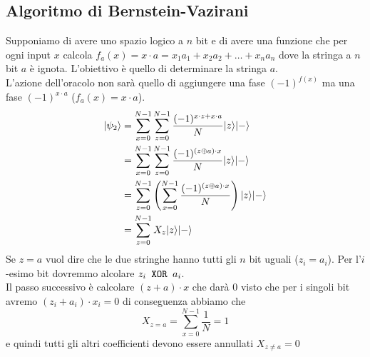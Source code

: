 \documentclass[12pt, a4paper]{report}
\begin{document}
\subsection{Algoritmo di Bernstein-Vazirani}
Supponiamo di avere uno spazio logico a $n$ bit e di avere una funzione che per ogni input $x$ calcola $f_{a}(x)=x\cdot a = x_{1}a_{1}+x_{2}a_{2}+\ldots+x_{n}a_{n}$ dove la stringa a $n$ bit $a$ è ignota. L'obiettivo è quello di determinare la stringa $a$.\\
L'azione dell'oracolo non sarà quello di aggiungere una fase $(-1)^{f(x)}$ ma una fase $(-1)^{x\cdot a}$ ($f_{a}(x)=x\cdot a$).
\begin{equation*}
    \begin{split}
        | \psi_{2} \rangle &= \sum_{x=0}^{N-1}\sum_{z=0}^{N-1} \frac{(-1)^{x\cdot z+x\cdot a}}{N}| z \rangle| - \rangle \\
        &= \sum_{x=0}^{N-1}\sum_{z=0}^{N-1} \frac{(-1)^{(z\oplus a)\cdot x}}{N}| z \rangle| - \rangle \\
        &= \sum_{z=0}^{N-1}\left(\sum_{x=0}^{N-1} \frac{(-1)^{(z\oplus a)\cdot x}}{N}\right)| z \rangle| - \rangle \\
        &= \sum_{z=0}^{N-1}X_{z}| z \rangle| - \rangle
    \end{split}
\end{equation*}
Se $z=a$ vuol dire che le due stringhe hanno tutti gli $n$ bit uguali ($z_{i}=a_{i}$). Per l'$i$-esimo bit dovremmo alcolare $z_{i}\text{\texttt{ XOR }}a_{i}$.\\
Il passo successivo è calcolare $(z+a)\cdot x$ che darà 0 visto che per i singoli bit avremo $(z_{i}+a_{i})\cdot x_{i}=0$ di conseguenza abbiamo che 
\begin{equation*}
    X_{z=a}=\sum_{x=0}^{N-1} \frac{1}{N} = 1
\end{equation*}
e quindi tutti gli altri coefficienti devono essere annullati $X_{z\neq a}=0$
\end{document}
